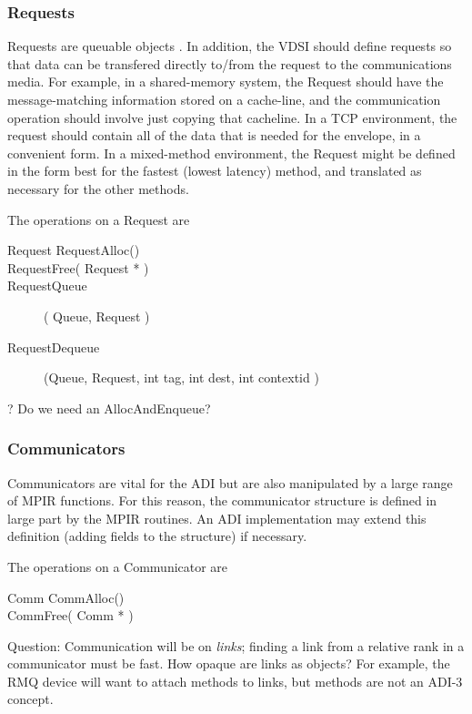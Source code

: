 \documentclass{article}
\let\note=\marginpar
\begin{document}
\subsubsection{Requests}
Requests are queuable objects \note{should everything be queueable?}.  In
addition, the VDSI should define requests so that data can be transfered
directly to/from the request to the communications media.  For example, in a
shared-memory system, the Request should have the message-matching information
stored on a cache-line, and the communication operation should involve just
copying that cacheline.  In a TCP environment, the request should contain all
of the data that is needed for the envelope, in a convenient form.  In a
mixed-method environment, the Request might be defined in the form best for
the fastest (lowest latency) method, and translated as necessary for the other
methods.  

The operations on a Request are
\begin{description}
\item[Request RequestAlloc()]
\item[RequestFree( Request * )]
\item[RequestQueue]( Queue, Request )
\item[RequestDequeue](Queue, Request, int tag, int dest, int contextid )
\end{description}
? Do we need an AllocAndEnqueue?

\subsubsection{Communicators}
Communicators are vital for the ADI but are also manipulated by a large range
of MPIR functions.  For this reason, the communicator structure is defined in
large part by the MPIR routines.  An ADI implementation may extend this
definition (adding fields to the structure) if necessary.

The operations on a Communicator are
\begin{description}
\item[Comm CommAlloc()]
\item[CommFree( Comm * )]
\end{description}

Question:  Communication will be on \emph{links}; finding a link from a
relative rank 
in a communicator must be fast.  How opaque are links as objects?  For
example, the RMQ device will want to attach methods to links, but methods are
not an ADI-3 concept.
\end{document}
